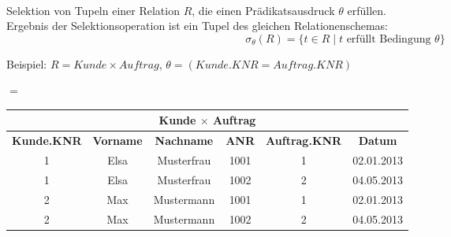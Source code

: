 \begin{frame}
\frametitle{\insertsection}
\framesubtitle{\insertsubsection}
\onslide
{}\\[8pt]
\begin{block}{}
	Selektion von Tupeln einer Relation $R$, die einen Prädikatsausdruck $\theta$ erfüllen.\\
	Ergebnis der Selektionsoperation ist ein Tupel des gleichen Relationenschemas:
	\begin{equation*}
	\sigma_{\theta}(R)=\{t\in R\mid t \text{ erf\"ullt Bedingung } \theta\}
	\end{equation*}
\end{block}
\pause
\abs
Beispiel: $R=Kunde\times Auftrag$, $\theta = (Kunde.KNR=Auftrag.KNR)$
\begin{center}
	 $=$
	\begin{tabular}{|c|c|c|c|c|c|}\hline
		\multicolumn{6}{|c|}{\footnotesize \textbf{Kunde $\times$ Auftrag}}\\\hline\hline
		\footnotesize{\textbf{Kunde.KNR}} & \footnotesize{\textbf{Vorname}} & \footnotesize{\textbf{Nachname}} &\footnotesize{\textbf{ANR}} & \footnotesize{\textbf{Auftrag.KNR}}&\footnotesize{\textbf{Datum}}\\\hline
		\cellcolor{Green}1 &\cellcolor{Green} Elsa & \cellcolor{Green}Musterfrau &\cellcolor{Green} 1001  &\cellcolor{Green} 1 &\cellcolor{Green} 02.01.2013\\\hline
		1 & Elsa & Musterfrau & 1002 &2& 04.05.2013\\\hline
		2 & Max & Mustermann & 1001  &1& 02.01.2013\\\hline
		\cellcolor{Green}2 &\cellcolor{Green} Max & \cellcolor{Green}Mustermann & \cellcolor{Green}1002  & \cellcolor{Green}2&\cellcolor{Green} 04.05.2013\\\hline
	\end{tabular}
\end{center}
\end{frame}

